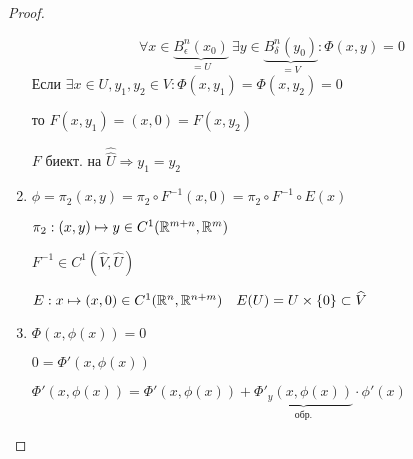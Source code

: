 \begin{proof}
\begin{enumerate}
                \[
                      \forall x \in \underbrace{B_\epsilon^n(x_0)}_{= U} \ \exists y \in \underbrace{B_\delta^n(y_0)}_{= V} : \Phi(x, y) = 0
                \]
                Если $\exists x \in U, y_1, y_2 \in V : \Phi(x, y_1) = \Phi(x, y_2) = 0$
                \par \quad то $F(x, y_1) = (x, 0) = F(x, y_2)$
                \par \quad \quad $F$ биект. на $\widehat{\widehat U} \Rightarrow y_1 = y_2$ %
            \item $\phi = \pi_2(x, y) = \pi_2 \circ F^{-1}(x, 0) = \pi_2 \circ F^{-1} \circ E(x)$
                \par $\pi_2 : (x, y) \mapsto y \in C^1(\mathbb{R}^{m+n}, \mathbb{R}^m)$
                \par $F^{-1} \in C^1(\widehat V, \widehat U)$
                \par $E  : x \mapsto (x, 0) \in C^1(\mathbb{R}^n, \mathbb{R}^{n+m}) \quad E(U) = U \times \{0\} \subset \widehat V$
            \item $\Phi(x, \phi(x)) = 0$
                \par $0 = \Phi'(x, \phi(x))$ %
                \par $\Phi'(x, \phi(x)) = \Phi'(x, \phi(x)) + \underbrace{\Phi'_y(x, \phi(x))}_{\text{обр.}} \cdot \phi'(x)$ 
        \end{enumerate}
    \end{proof}

